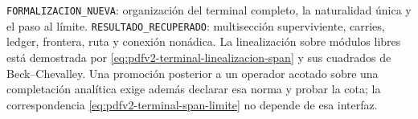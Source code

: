 \begin{statusbox}
\texttt{FORMALIZACION\_NUEVA}: organizaci\'on del terminal completo, la
naturalidad \'unica y el paso al l\'imite.\quad
\texttt{RESULTADO\_RECUPERADO}: multisecci\'on superviviente, carries,
ledger, frontera, ruta y conexi\'on non\'adica.\quad
La linealización sobre módulos libres está demostrada por
\eqref{eq:pdfv2-terminal-linealizacion-span} y sus cuadrados de
Beck--Chevalley. Una promoción posterior a un operador acotado sobre una
completación analítica exige además declarar esa norma y probar la cota; la
correspondencia \eqref{eq:pdfv2-terminal-span-limite} no depende de esa
interfaz.
\end{statusbox}
